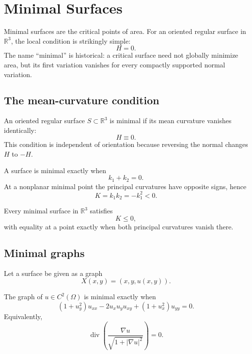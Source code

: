 \chapter{Minimal Surfaces}
\label{ch:vii19-minimal-surfaces}

Minimal surfaces are the critical points of area.  For an oriented regular surface in
\(\mathbb R^3\), the local condition is strikingly simple:
\[
\boxed{H=0.}
\]
The name ``minimal'' is historical: a critical surface need not globally minimize
area, but its first variation vanishes for every compactly supported normal
variation.

\section{The mean-curvature condition}

\begin{definition}\label{def:vii19-minimal}
An oriented regular surface \(S\subset\mathbb R^3\) is minimal if its mean curvature
vanishes identically:
\[
H\equiv 0.
\]
This condition is independent of orientation because reversing the normal changes
\(H\) to \(-H\).
\end{definition}

\begin{proposition}\label{prop:vii19-principal}
A surface is minimal exactly when
\[
k_1+k_2=0.
\]
At a nonplanar minimal point the principal curvatures have opposite signs, hence
\[
K=k_1k_2=-k_1^2<0.
\]
\end{proposition}

\begin{corollary}\label{cor:vii19-k-nonpositive}
Every minimal surface in \(\mathbb R^3\) satisfies
\[
K\le 0,
\]
with equality at a point exactly when both principal curvatures vanish there.
\end{corollary}

\section{Minimal graphs}

Let a surface be given as a graph
\[
X(x,y)=(x,y,u(x,y)).
\]

\begin{theorem}\label{thm:vii19-mse}
The graph of \(u\in C^2(\Omega)\) is minimal exactly when
\[
(1+u_y^2)u_{xx}-2u_xu_yu_{xy}+(1+u_x^2)u_{yy}=0.
\]
Equivalently,
\[
\operatorname{div}\!\left(
\frac{\nabla u}{\sqrt{1+|\nabla u|^2}}
\right)=0.
\]
\end{theorem}

